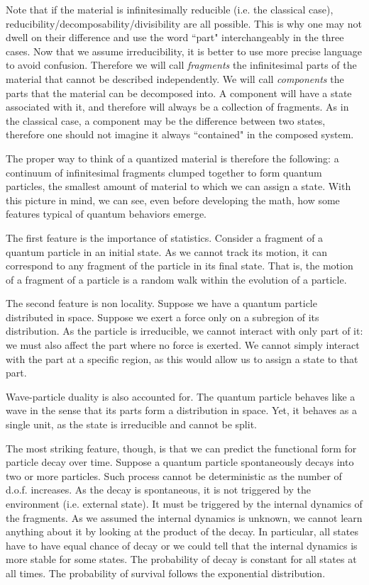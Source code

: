\documentclass[smallextended]{svjour3}
\numberwithin{equation}{section}
\begin{document}
Note that if the material is infinitesimally reducible (i.e. the classical case), reducibility/decomposability/divisibility are all possible. This is why one may not dwell on their difference and use the word ``part" interchangeably in the three cases. Now that we assume irreducibility, it is better to use more precise language to avoid confusion. Therefore we will call \emph{fragments} the infinitesimal parts of the material that cannot be described independently. We will call \emph{components} the parts that the material can be decomposed into. A component will have a state associated with it, and therefore will always be a collection of fragments. As in the classical case, a component may be the difference between two states, therefore one should not imagine it always ``contained" in the composed system.

The proper way to think of a quantized material is therefore the following: a continuum of infinitesimal fragments clumped together to form quantum particles, the smallest amount of material to which we can assign a state. With this picture in mind, we can see, even before developing the math, how some features typical of quantum behaviors emerge.

The first feature is the importance of statistics. Consider a fragment of a quantum particle in an initial state. As we cannot track its motion, it can correspond to any fragment of the particle in its final state. That is, the motion of a fragment of a particle is a random walk within the evolution of a particle.

The second feature is non locality. Suppose we have a quantum particle distributed in space. Suppose we exert a force only on a subregion of its distribution. As the particle is irreducible, we cannot interact with only part of it: we must also affect the part where no force is exerted. We cannot simply interact with the part at a specific region, as this would allow us to assign a state to that part.

Wave-particle duality is also accounted for. The quantum particle behaves like a wave in the sense that its parts form a distribution in space. Yet, it behaves as a single unit, as the state is irreducible and cannot be split.

The most striking feature, though, is that we can predict the functional form for particle decay over time. Suppose a quantum particle spontaneously decays into two or more particles. Such process cannot be deterministic as the number of d.o.f. increases. As the decay is spontaneous, it is not triggered by the environment (i.e. external state). It must be triggered by the internal dynamics of the fragments. As we assumed the internal dynamics is unknown, we cannot learn anything about it by looking at the product of the decay. In particular, all states have to have equal chance of decay or we could tell that the internal dynamics is more stable for some states. The probability of decay is constant for all states at all times. The probability of survival follows the exponential distribution.
\end{document}
